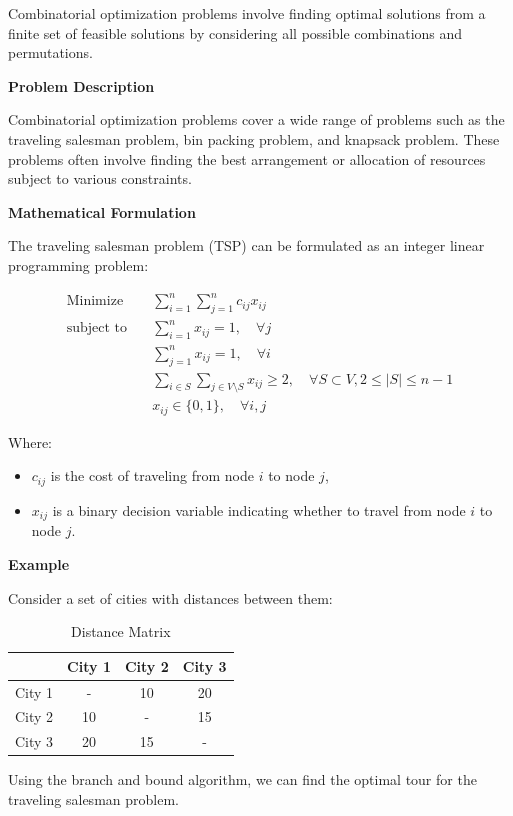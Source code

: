 \documentclass[12pt]{book} %
\begin{document}
Combinatorial optimization problems involve finding optimal solutions from a finite set of feasible solutions by considering all possible combinations and permutations.

\textbf{Problem Description}

Combinatorial optimization problems cover a wide range of problems such as the traveling salesman problem, bin packing problem, and knapsack problem. These problems often involve finding the best arrangement or allocation of resources subject to various constraints.

\textbf{Mathematical Formulation}

The traveling salesman problem (TSP) can be formulated as an integer linear programming problem:

\[
\begin{aligned}
\text{Minimize} \quad & \sum_{i=1}^{n} \sum_{j=1}^{n} c_{ij} x_{ij} \\
\text{subject to} \quad & \sum_{i=1}^{n} x_{ij} = 1, \quad \forall j \\
& \sum_{j=1}^{n} x_{ij} = 1, \quad \forall i \\
& \sum_{i \in S} \sum_{j \in V \setminus S} x_{ij} \geq 2, \quad \forall S \subset V, 2 \leq |S| \leq n-1 \\
& x_{ij} \in \{0, 1\}, \quad \forall i, j
\end{aligned}
\]

Where:
\begin{itemize}
    \item $c_{ij}$ is the cost of traveling from node $i$ to node $j$,
    \item $x_{ij}$ is a binary decision variable indicating whether to travel from node $i$ to node $j$.
\end{itemize}

\textbf{Example}

Consider a set of cities with distances between them:
\FloatBarrier
\begin{table}[H]
    \centering
    \begin{tabular}{|c|c|c|c|}
    \hline
    & City 1 & City 2 & City 3 \\
    \hline
    City 1 & - & 10 & 20 \\
    City 2 & 10 & - & 15 \\
    City 3 & 20 & 15 & - \\
    \hline
    \end{tabular}
    \caption{Distance Matrix}
\end{table}
\FloatBarrier
Using the branch and bound algorithm, we can find the optimal tour for the traveling salesman problem.
\end{document}

